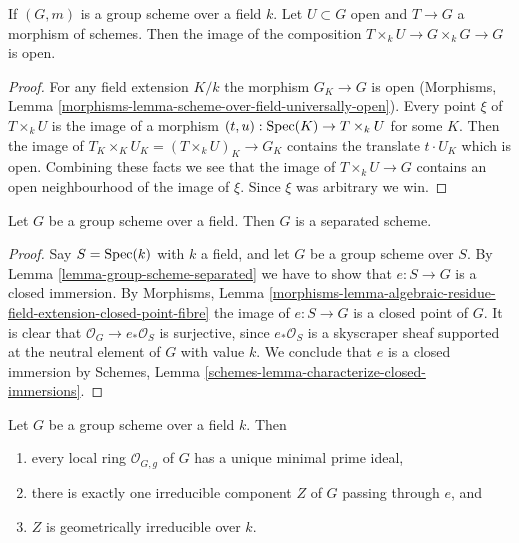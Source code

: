 \begin{lemma}
\label{lemma-group-scheme-over-field-translate-open}
If $(G, m)$ is a group scheme over a field $k$. Let $U \subset G$
open and $T \to G$ a morphism of schemes. Then the image of the
composition $T \times_k U \to G \times_k G \to G$ is open.
\end{lemma}

\begin{proof}
For any field extension $K/k$ the morphism $G_K \to G$ is open
(Morphisms, Lemma \ref{morphisms-lemma-scheme-over-field-universally-open}).
Every point $\xi$ of $T \times_k U$ is the image of a morphism
$(t, u) : \mathop{\mathrm{Spec}}(K) \to T \times_k U$ for some $K$. Then the image of
$T_K \times_K U_K = (T \times_k U)_K \to G_K$ contains the translate
$t \cdot U_K$ which is open. Combining these facts we see that the
image of $T \times_k U \to G$ contains an open neighbourhood of
the image of $\xi$. Since $\xi$ was arbitrary we win.
\end{proof}

\begin{lemma}
\label{lemma-group-scheme-over-field-separated}
Let $G$ be a group scheme over a field.
Then $G$ is a separated scheme.
\end{lemma}

\begin{proof}
Say $S = \mathop{\mathrm{Spec}}(k)$ with $k$ a field, and let $G$ be a group scheme
over $S$. By
Lemma \ref{lemma-group-scheme-separated}
we have to show that $e : S \to G$ is a closed immersion. By
Morphisms, Lemma
\ref{morphisms-lemma-algebraic-residue-field-extension-closed-point-fibre}
the image of $e : S \to G$ is a closed point of $G$.
It is clear that $\mathcal{O}_G \to e_*\mathcal{O}_S$ is surjective,
since $e_*\mathcal{O}_S$ is a skyscraper sheaf supported at the neutral
element of $G$ with value $k$. We conclude that $e$ is a closed immersion by
Schemes, Lemma \ref{schemes-lemma-characterize-closed-immersions}.
\end{proof}

\begin{lemma}
\label{lemma-group-scheme-field-geometrically-irreducible}
Let $G$ be a group scheme over a field $k$.
Then
\begin{enumerate}
\item every local ring $\mathcal{O}_{G, g}$ of $G$ has a unique
minimal prime ideal,
\item there is exactly one irreducible component $Z$ of $G$
passing through $e$, and
\item $Z$ is geometrically irreducible over $k$.
\end{enumerate}
\end{lemma}

